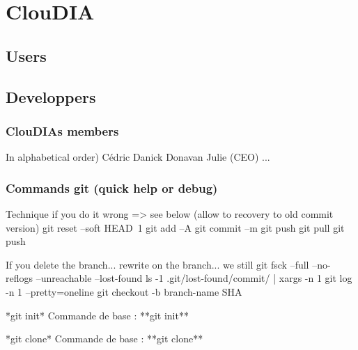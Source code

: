 \section*{Clou\+D\+I\+A}

\subsection*{Users}

\subsection*{Developpers}

\subsubsection*{Clou\+D\+I\+As\textquotesingle{} members}


\begin{DoxyItemize}
\item 
\end{DoxyItemize}In alphabetical order) Cédric Danick Donavan Julie (C\+E\+O) ... 

\subsubsection*{Commands git (quick help or debug)}


\begin{DoxyPre}
Technique if you do it wrong => see below (allow to recovery to old commit version)
git reset –soft HEAD~1 
git add –A
git commit –m 
git push
git pull
git push\end{DoxyPre}



\begin{DoxyPre}If you delete the branch... rewrite on the branch... we still 
git fsck --full --no-reflogs --unreachable --lost-found
ls -1 .git/lost-found/commit/ | xargs -n 1 git log -n 1 --pretty=oneline
git checkout -b branch-name SHA\end{DoxyPre}



\begin{DoxyPre}*git init*
Commande de base : **git init**\end{DoxyPre}



\begin{DoxyPre}*git clone*
Commande de base : **git clone**\end{DoxyPre}



